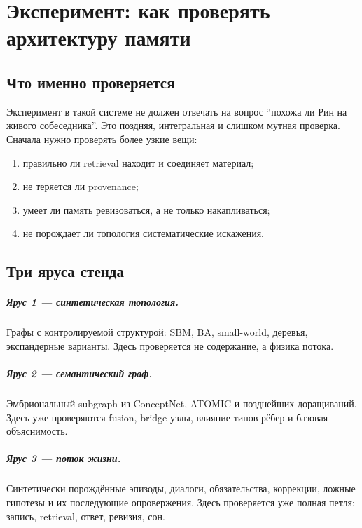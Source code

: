 \chapter{Эксперимент: как проверять архитектуру памяти}
\label{ch:experiment}

\section{Что именно проверяется}

Эксперимент в такой системе не должен отвечать на вопрос ``похожа ли Рин на живого
собеседника''. Это поздняя, интегральная и слишком мутная проверка. Сначала нужно
проверять более узкие вещи:
\begin{enumerate}
\item правильно ли retrieval находит и соединяет материал;
\item не теряется ли provenance;
\item умеет ли память ревизоваться, а не только накапливаться;
\item не порождает ли топология систематические искажения.
\end{enumerate}

\section{Три яруса стенда}

\paragraph{Ярус 1 — синтетическая топология.}
Графы с контролируемой структурой: SBM, BA, small-world, деревья, экспандерные
варианты. Здесь проверяется не содержание, а физика потока.

\paragraph{Ярус 2 — семантический граф.}
Эмбриональный subgraph из ConceptNet, ATOMIC и позднейших доращиваний. Здесь уже
проверяются fusion, bridge-узлы, влияние типов рёбер и базовая объяснимость.

\paragraph{Ярус 3 — поток жизни.}
Синтетически порождённые эпизоды, диалоги, обязательства, коррекции, ложные гипотезы
и их последующие опровержения. Здесь проверяется уже полная петля: запись, retrieval,
ответ, ревизия, сон.

